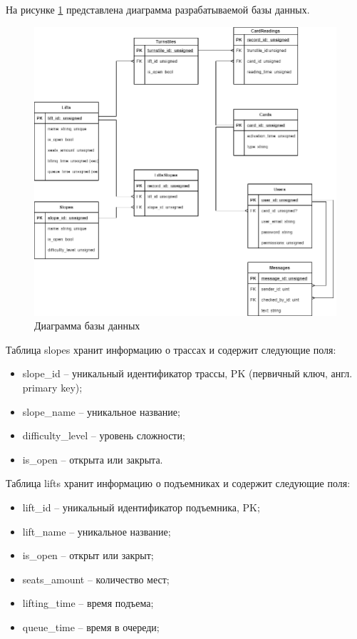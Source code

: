 На рисунке \ref{img:db} представлена диаграмма разрабатываемой базы данных.

\begin{figure}[h!]
	\begin{center}
		\includegraphics[scale=0.4]{../imgs/db/db.png}
	\end{center}
	\captionsetup{justification=centering}
	\caption{Диаграмма базы данных}
	\label{img:db}
\end{figure}

Таблица slopes хранит информацию о трассах и содержит следующие поля:
\begin{itemize}
	\item slope\_id -- уникальный идентификатор трассы, PK (первичный ключ, англ. primary key);
	\item slope\_name -- уникальное название;
	\item difficulty\_level -- уровень сложности;
	\item is\_open -- открыта или закрыта.
\end{itemize}


Таблица lifts хранит информацию о подъемниках и содержит следующие поля:
\begin{itemize}
	\item lift\_id -- уникальный идентификатор подъемника, PK;
	\item lift\_name -- уникальное название;
	\item is\_open -- открыт или закрыт;
	\item seats\_amount -- количество мест;
	\item lifting\_time -- время подъема;
	\item queue\_time -- время в очереди;
\end{itemize}


